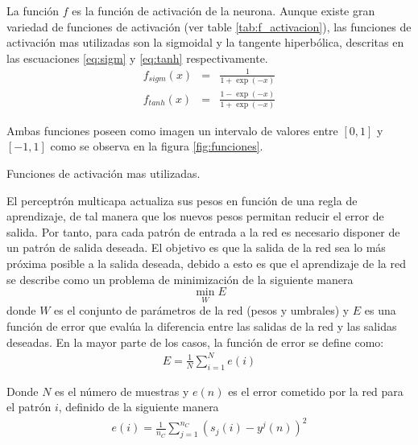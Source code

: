 La función $f$ es la función de activación de la neurona. Aunque existe gran variedad de funciones de activación (ver table \ref{tab:f_activacion}), las funciones de activación mas utilizadas son la sigmoidal y la tangente hiperbólica, descritas en las escuaciones \ref{eq:sigm} y \ref{eq:tanh} respectivamente.
\begin{eqnarray}
	f_{sigm}(x) &=& \frac{1}{1+\exp(-x)}\label{eq:sigm}\\
	f_{tanh}(x) &=& \frac{1 - \exp(-x)}{1 + \exp(-x)}\label{eq:tanh}
\end{eqnarray}

Ambas funciones poseen como imagen un intervalo de valores entre $[0, 1]$ y $[-1, 1]$ como se observa en la figura \ref{fig:funciones}.%

\begin{imagen}
	\scalebox{1.0}{}
	\caption{Funciones de activación mas utilizadas.}
	\label{fig:funciones}
\end{imagen}


El perceptrón multicapa actualiza sus pesos en función de una regla de aprendizaje, de tal manera que los nuevos pesos permitan reducir el error de salida. Por tanto, para cada patrón de entrada a la red es necesario disponer de un patrón de salida deseada. El objetivo es que la salida de la red sea lo más próxima posible a la salida deseada, debido a esto es que el aprendizaje de la red se describe como un problema de minimización de la siguiente manera $$ \min_{W} E $$ donde $W$ es el conjunto de parámetros de la red (pesos y umbrales) y $E$ es una función de error que evalúa la diferencia entre las salidas de la red y las salidas deseadas. En la mayor parte de los casos, la función de error se define como:
\begin{eqnarray}
	E = \frac{1}{N}\sum^{N}_{i = 1} e(i)
\end{eqnarray}

Donde $N$ es el número de muestras y $e(n)$ es el error cometido por la red para el patrón $i$, definido de la siguiente manera
\begin{eqnarray}
	e(i) = \frac{1}{n_{C}}\sum^{n_{C}}_{j = 1} (s_{j}(i) - y^{j}(n))^2\label{eq:error_patron}
\end{eqnarray}

